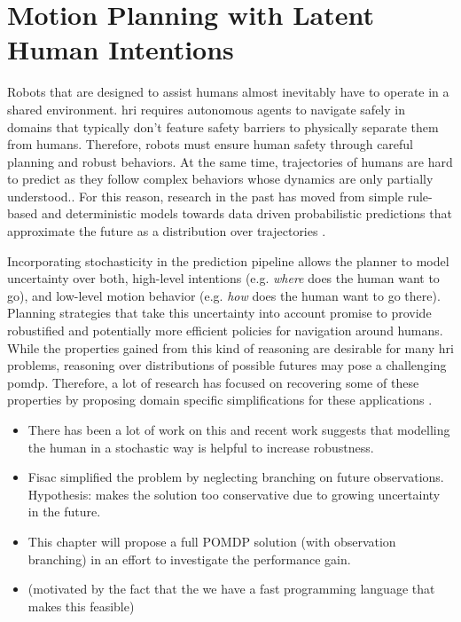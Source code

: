 \chapter{Motion Planning with Latent Human Intentions}\label{chap:hri}

Robots that are designed to assist humans almost inevitably have to operate in
a shared environment. \ac{hri} requires autonomous agents to navigate
safely in domains that typically don't feature safety barriers to physically
separate them from humans. Therefore, robots must ensure human safety through
careful planning and robust behaviors. At the same time, trajectories of humans
are hard to predict as they follow complex behaviors whose dynamics are only
partially understood.. For this reason, research in the past
has moved from simple rule-based and deterministic models  towards data driven probabilistic predictions that approximate the future
as a distribution over trajectories .

Incorporating stochasticity in the prediction pipeline allows the planner to
model uncertainty over both, high-level intentions (e.g. \emph{where} does the
human want to go), and low-level motion behavior (e.g. \emph{how} does the
human want to go there). Planning strategies that take this uncertainty into
account promise to provide robustified and potentially more efficient policies
for navigation around humans. While the properties gained from this kind of
reasoning are desirable for many \ac{hri} problems, reasoning over
distributions of possible futures may pose a challenging \ac{pomdp}. Therefore,
a lot of research has focused on recovering some of these properties by
proposing domain specific simplifications for these applications
\cite{fern2007decision, sadigh2016information, javdani2018shared, fisac2018probabilistically}.

\begin{itemize}
  \item There has been a lot of work on this and recent work suggests that modelling the human in a stochastic way is helpful to increase robustness. \cite{fisac2018probabilistically}
  \item Fisac simplified the problem by neglecting branching on future observations. Hypothesis: makes the solution too conservative due to growing uncertainty in the future.
  \item This chapter will propose a full POMDP solution (with observation branching) in an effort to investigate the performance gain.
  \item (motivated by the fact that the we have a fast programming language that makes this feasible)
\end{itemize}

